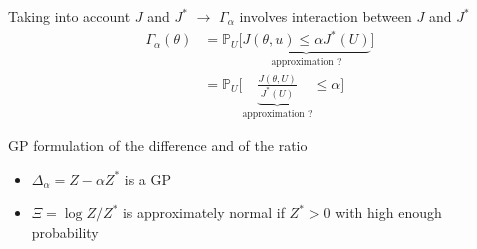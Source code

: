 \documentclass[10pt,aspectratio=169,usepdftitle=false]{beamer}
\newcommand{\GP}{\mathsf{GP}}
\newcommand{\Prob}{\mathbb{P}}
\newcommand{\kk}{\theta}
\newcommand{\uu}{u}
\newcommand{\UU}{U}
\begin{document}
\begin{frame}{Taking into account $J$ and $J^*$}
   $\rightarrow$ $\Gamma_{\alpha}$ involves interaction between $J$ and $J^*$
  \begin{align}
    \Gamma_{\alpha}(\kk)&= \Prob_{\UU}\big[\underbrace{J(\kk, \uu) \leq \alpha J^*(\UU)}_{\text{approximation ?}} \big] \\
                        &= \Prob_{\UU}\bigg[ \underbrace{\frac{J(\kk, \UU)}{J^*(\UU)}}_{\text{approximation ?}} \leq \alpha\bigg]
  \end{align}
  \begin{block}{GP formulation of the difference and of the ratio}
    \begin{itemize}
  \item $\Delta_{\alpha} = Z - \alpha Z^*$ is a GP
\item $\Xi = \log Z/Z^*$ is approximately normal if $Z^* > 0$ with high enough probability
\end{itemize}
\end{block}
\end{frame}
\end{document}
